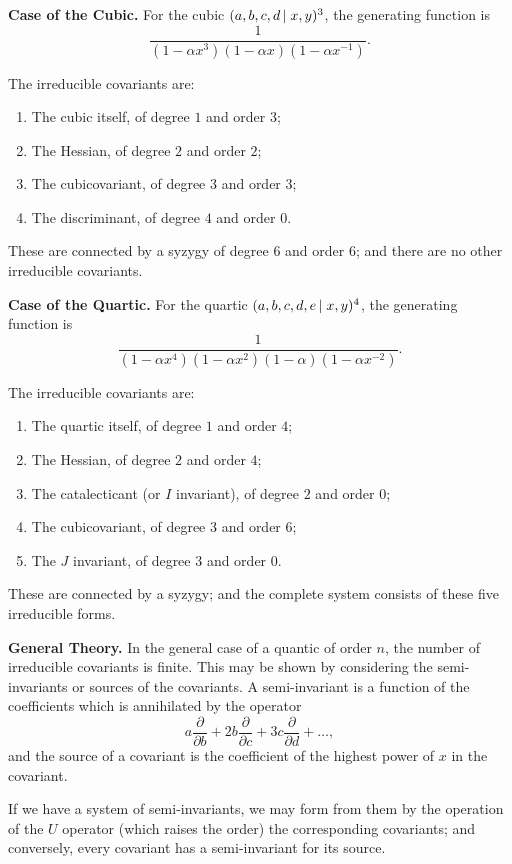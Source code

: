 \documentclass[12pt,a4paper]{article}
\begin{document}
\textbf{Case of the Cubic.} For the cubic $(a,b,c,d \mspace{-2mu}\mid x,y)^3$, the generating
function is
%
\[
\frac{1}{(1-\alpha x^3)(1-\alpha x)(1-\alpha x^{-1})}.
\]

The irreducible covariants are:
\begin{enumerate}[label=(\arabic*)]
\item The cubic itself, of degree $1$ and order $3$;
\item The Hessian, of degree $2$ and order $2$;
\item The cubicovariant, of degree $3$ and order $3$;
\item The discriminant, of degree $4$ and order $0$.
\end{enumerate}

These are connected by a syzygy of degree $6$ and order $6$; and there are
no other irreducible covariants.

\textbf{Case of the Quartic.} For the quartic $(a,b,c,d,e \mspace{-2mu}\mid x,y)^4$, the
generating function is
%
\[
\frac{1}{(1-\alpha x^4)(1-\alpha x^2)(1-\alpha)(1-\alpha x^{-2})}.
\]

The irreducible covariants are:
\begin{enumerate}[label=(\arabic*)]
\item The quartic itself, of degree $1$ and order $4$;
\item The Hessian, of degree $2$ and order $4$;
\item The catalecticant (or $I$ invariant), of degree $2$ and order $0$;
\item The cubicovariant, of degree $3$ and order $6$;
\item The $J$ invariant, of degree $3$ and order $0$.
\end{enumerate}

These are connected by a syzygy; and the complete system consists of these
five irreducible forms.

\textbf{General Theory.} In the general case of a quantic of order $n$, the number
of irreducible covariants is finite. This may be shown by considering the
semi-invariants or sources of the covariants. A semi-invariant is a function
of the coefficients which is annihilated by the operator
%
\[
a \frac{\partial}{\partial b} + 2b \frac{\partial}{\partial c} + 3c \frac{\partial}{\partial d} + \ldots,
\]
%
and the source of a covariant is the coefficient of the highest power of $x$
in the covariant.

If we have a system of semi-invariants, we may form from them by the
operation of the $U$ operator (which raises the order) the corresponding
covariants; and conversely, every covariant has a semi-invariant for its
source.
\end{document}
